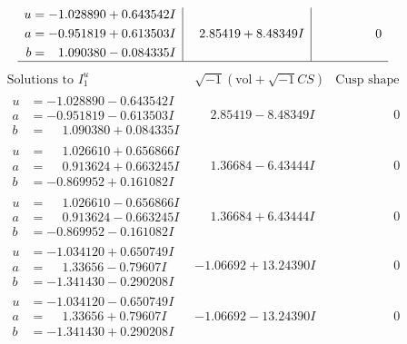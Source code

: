 \documentclass[1p]{elsarticle_modified}
\theoremstyle{definition}
\newcommand{\I}{\sqrt{-1}}
\begin{document}
$$\begin{array}{c|c|c}
\begin{aligned}
u &= -1.028890 + 0.643542 I \\
a &= -0.951819 + 0.613503 I \\
b &= \phantom{-}1.090380 - 0.084335 I\end{aligned}
 & \phantom{-}2.85419 + 8.48349 I & \phantom{-0.000000 } 0\\
 \hline 
 \end{array}$$\newpage$$\begin{array}{c|c|c}  
\text{Solutions to }I^u_{1}& \I (\text{vol} + \sqrt{-1}CS) & \text{Cusp shape}\\
 \hline 
\begin{aligned}
u &= -1.028890 - 0.643542 I \\
a &= -0.951819 - 0.613503 I \\
b &= \phantom{-}1.090380 + 0.084335 I\end{aligned}
 & \phantom{-}2.85419 - 8.48349 I & \phantom{-0.000000 } 0 \\ \hline\begin{aligned}
u &= \phantom{-}1.026610 + 0.656866 I \\
a &= \phantom{-}0.913624 + 0.663245 I \\
b &= -0.869952 + 0.161082 I\end{aligned}
 & \phantom{-}1.36684 - 6.43444 I & \phantom{-0.000000 } 0 \\ \hline\begin{aligned}
u &= \phantom{-}1.026610 - 0.656866 I \\
a &= \phantom{-}0.913624 - 0.663245 I \\
b &= -0.869952 - 0.161082 I\end{aligned}
 & \phantom{-}1.36684 + 6.43444 I & \phantom{-0.000000 } 0 \\ \hline\begin{aligned}
u &= -1.034120 + 0.650749 I \\
a &= \phantom{-}1.33656 - 0.79607 I \\
b &= -1.341430 - 0.290208 I\end{aligned}
 & -1.06692 + 13.24390 I & \phantom{-0.000000 } 0 \\ \hline\begin{aligned}
u &= -1.034120 - 0.650749 I \\
a &= \phantom{-}1.33656 + 0.79607 I \\
b &= -1.341430 + 0.290208 I\end{aligned}
 & -1.06692 - 13.24390 I & \phantom{-0.000000 } 0 \\ \hline\begin{aligned}

\end{aligned}
\end{array}$$
\end{document}
